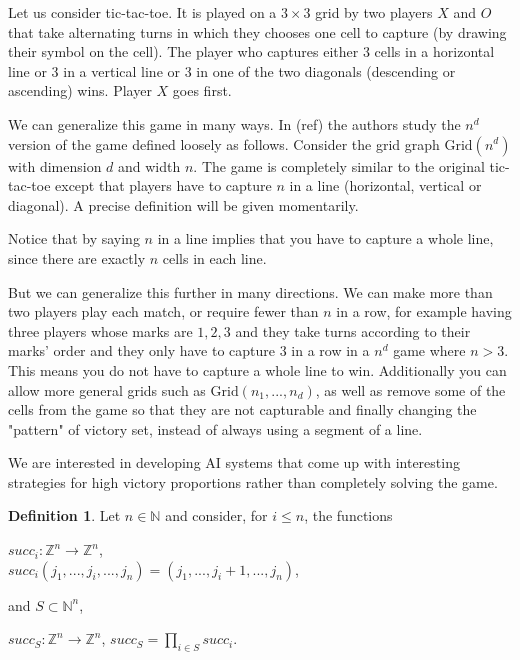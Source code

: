 \documentclass[]{article}
\theoremstyle{definition}
\newtheorem{definition}{Definition}[section]
\theoremstyle{definition}
\newcommand{\raw}{\rightarrow}
\newcommand{\bb}{\mathbb}
\begin{document}
	Let us consider tic-tac-toe. It is played on a $3\times3$ grid by two players $X$ and $O$ that take alternating turns in which they chooses one cell to capture (by drawing their symbol on the cell). The player who captures either 3 cells in a horizontal line or 3 in a vertical line or 3 in one of the two diagonals (descending or ascending) wins. Player $X$ goes first.
	
	We can generalize this game in many ways. In (ref) the authors study the $n^d$ version of the game defined loosely as follows. Consider the grid graph $\text{Grid}(n^d)$ with dimension $d$ and width $n$. The game is completely similar to the original tic-tac-toe except that players have to capture $n$ in a line (horizontal, vertical or diagonal). A precise definition will be given momentarily.
	
	Notice that by saying $n$ in a line implies that you have to capture a whole line, since there are exactly $n$ cells in each line.
	
	But we can generalize this further in many directions. We can make more than two players play each match, or require fewer than $n$ in a row, for example having three players whose marks are $1, 2, 3$ and they take turns according to their marks' order and they only have to capture 3 in a row in a $n^d$ game where $n > 3$. This means you do not have to capture a whole line to win. Additionally you can allow more general grids such as $\text{Grid}(n_1, ..., n_d)$, as well as remove some of the cells from the game so that they are not capturable and finally changing the "pattern" of victory set, instead of always using a segment of a line. 
	
	We are interested in developing AI systems that come up with interesting strategies for high victory proportions rather than completely solving the game. 
	
	\begin{definition}
		Let $n \in \bb{N}$ and consider, for $i \leq n$, the functions 
		
		\begin{center}
			$succ_i: \bb{Z}^n \raw \bb{Z}^n$, \\ $succ_i(j_1, ..., j_i, ..., j_n) = (j_1, ..., j_i + 1, ..., j_n)$,
		\end{center}
		
		and $S \subset \bb{N}^n$, 
		
		\begin{center}
			$succ_S: \bb{Z}^n \raw \bb{Z}^n$, $succ_S = \prod_{i \in S} succ_i$.
		\end{center}
		
	\end{definition}
	
\end{document}
